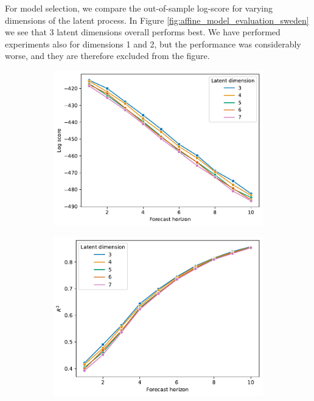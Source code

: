 \documentclass[11pt]{article}
\begin{document}
For model selection, we compare the out-of-sample log-score for varying dimensions of the latent process. In Figure \ref{fig:affine_model_evaluation_sweden} we see that 3 latent dimensions overall performs best. We have performed experiments also for dimensions 1 and 2, but the performance was considerably worse, and they are therefore excluded from the figure.
\begin{figure}
    \centering
    \begin{subfigure}[t]{0.49\textwidth}
        \centering
        \includegraphics[width=\textwidth]{figs/latent_dim_comparison_linear.pdf}
        \caption{}
        \label{fig:model_evaluation_sweden_logscore}
    \end{subfigure}
    \hfill
    \begin{subfigure}[t]{0.49\textwidth}
        \centering
        \includegraphics[width=\textwidth]{figs/latent_dim_comparison_R2_linear.pdf}

\end{subfigure}
\end{figure}
\end{document}
